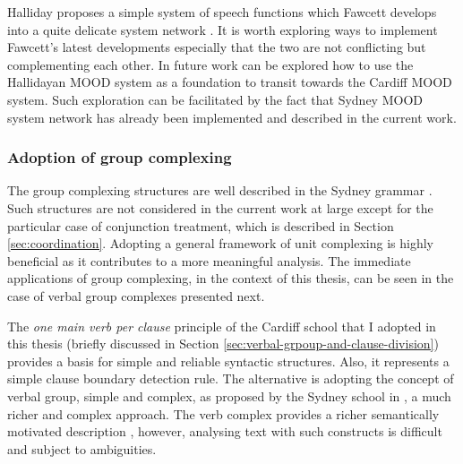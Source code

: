 
    Halliday proposes a simple system of speech functions \citep[136]{Halliday2013} which Fawcett develops into a quite delicate system network \citep{Fawcett2011}. It is worth exploring ways to implement Fawcett's latest developments especially that the two are not conflicting but complementing each other. In future work can be explored how to use the Hallidayan MOOD system as a foundation to transit towards the Cardiff MOOD system. Such exploration can be facilitated by the fact that Sydney MOOD system network has already been implemented and described in the current work.

\subsubsection{Adoption of group complexing}

    The group complexing structures are well described in the Sydney grammar \citep[567--592]{Halliday2013}. Such structures are not considered in the current work at large except for the particular case of conjunction treatment, which is described in Section \ref{sec:coordination}. Adopting a general framework of unit complexing is highly beneficial as it contributes to a more meaningful analysis. The immediate applications of group complexing, in the context of this thesis, can be seen in the case of verbal group complexes presented next. 

    The \textit{one main verb per clause} principle of the Cardiff school that I adopted in this thesis (briefly discussed in Section \ref{sec:verbal-grpoup-and-clause-division}) provides a basis for simple and reliable syntactic structures. Also, it represents a simple clause boundary detection rule. The alternative is adopting the concept of verbal group, simple and complex, as proposed by the Sydney school in \citet[396--418, 567--592]{Halliday2013}, a much richer and complex approach. The verb complex provides a richer semantically motivated description \citep[567--592]{Halliday2013}, however, analysing text with such constructs is difficult and subject to ambiguities.

